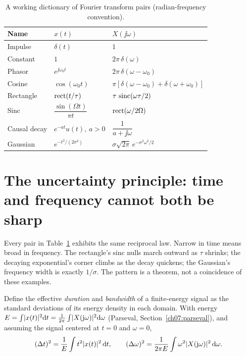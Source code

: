 \begin{table}[H]
\centering
\caption{A working dictionary of Fourier transform pairs (radian-frequency convention).}
\label{ch07:tbl-pairs}
\begin{tabular}{@{}lll@{}}
\toprule
Name & $x(t)$ & $X(\jj\omega)$ \\
\midrule
Impulse        & $\delta(t)$                 & $1$ \\
Constant       & $1$                         & $2\pi\,\delta(\omega)$ \\
Phasor         & $e^{\jj\omega_0 t}$         & $2\pi\,\delta(\omega-\omega_0)$ \\
Cosine         & $\cos(\omega_0 t)$          & $\pi[\delta(\omega-\omega_0)+\delta(\omega+\omega_0)]$ \\
Rectangle      & $\operatorname{rect}(t/\tau)$             & $\tau\,\operatorname{sinc}(\omega\tau/2)$ \\
Sinc           & $\dfrac{\sin(\Omega t)}{\pi t}$ & $\operatorname{rect}(\omega/2\Omega)$ \\
Causal decay   & $e^{-at}u(t),\ a>0$         & $\dfrac{1}{a+\jj\omega}$ \\
Gaussian       & $e^{-t^2/(2\sigma^2)}$      & $\sigma\sqrt{2\pi}\,e^{-\sigma^2\omega^2/2}$ \\
\bottomrule
\end{tabular}
\end{table}

\section{The uncertainty principle: time and frequency cannot both be sharp}
\label{ch07:uncertainty}

Every pair in Table~\ref{ch07:tbl-pairs} exhibits the same reciprocal law. Narrow in time means broad in frequency.
The rectangle's sinc nulls march outward as $\tau$ shrinks; the decaying exponential's
corner climbs as the decay quickens; the Gaussian's frequency width is exactly $1/\sigma$.
The pattern is a theorem, not a coincidence of these examples.

Define the effective \emph{duration} and \emph{bandwidth} of a finite-energy signal as
the standard deviations of its energy density in each domain. With energy
$E = \int\lvert x(t)\rvert^2\mathrm{d} t = \frac{1}{2\pi}\int\lvert X(\mathrm{j}\omega)\rvert^2\mathrm{d}\omega$ (Parseval,
Section~\ref{ch07:parseval}), and assuming the signal centered at $t=0$ and $\omega=0$,
\begin{equation}
(\Delta t)^2 = \frac{1}{E}\int t^2\lvert x(t)\rvert^2\,\mathrm{d} t,
\qquad
(\Delta\omega)^2 = \frac{1}{2\pi E}\int \omega^2\lvert X(\mathrm{j}\omega)\rvert^2\,\mathrm{d}\omega .
\end{equation}


